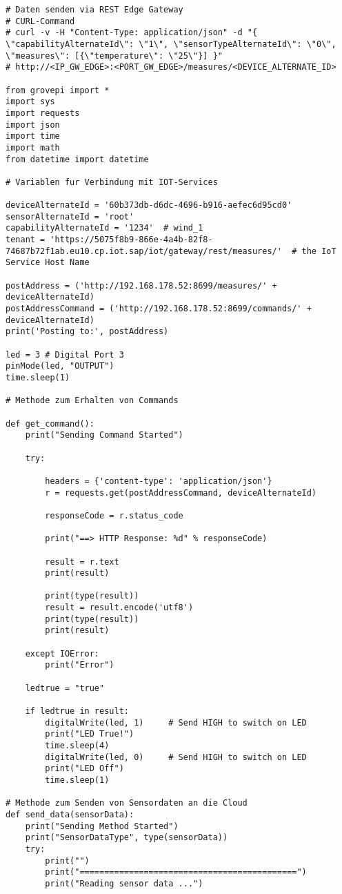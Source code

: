 \begin{lstlisting}
# Daten senden via REST Edge Gateway
# CURL-Command
# curl -v -H "Content-Type: application/json" -d "{ \"capabilityAlternateId\": \"1\", \"sensorTypeAlternateId\": \"0\", \"measures\": [{\"temperature\": \"25\"}] }"
# http://<IP_GW_EDGE>:<PORT_GW_EDGE>/measures/<DEVICE_ALTERNATE_ID>

from grovepi import *
import sys
import requests
import json
import time
import math
from datetime import datetime

# Variablen fur Verbindung mit IOT-Services

deviceAlternateId = '60b373db-d6dc-4696-b916-aefec6d95cd0'  
sensorAlternateId = 'root'  
capabilityAlternateId = '1234'  # wind_1
tenant = 'https://5075f8b9-866e-4a4b-82f8-74687b72f1ab.eu10.cp.iot.sap/iot/gateway/rest/measures/'  # the IoT Service Host Name

postAddress = ('http://192.168.178.52:8699/measures/' + deviceAlternateId)
postAddressCommand = ('http://192.168.178.52:8699/commands/' + deviceAlternateId)
print('Posting to:', postAddress)

led = 3 # Digital Port 3 
pinMode(led, "OUTPUT")
time.sleep(1)

# Methode zum Erhalten von Commands

def get_command():
    print("Sending Command Started")

    try:

        headers = {'content-type': 'application/json'}
        r = requests.get(postAddressCommand, deviceAlternateId)

        responseCode = r.status_code

        print("==> HTTP Response: %d" % responseCode)

        result = r.text
        print(result)

        print(type(result))
        result = result.encode('utf8')
        print(type(result))
        print(result)

    except IOError:
        print("Error")

    ledtrue = "true"

    if ledtrue in result:
        digitalWrite(led, 1)     # Send HIGH to switch on LED
        print("LED True!")
        time.sleep(4)
        digitalWrite(led, 0)     # Send HIGH to switch on LED
        print("LED Off")
        time.sleep(1)

# Methode zum Senden von Sensordaten an die Cloud
def send_data(sensorData):
    print("Sending Method Started")
    print("SensorDataType", type(sensorData))
    try:
        print("")
        print("============================================")
        print("Reading sensor data ...")


\end{lstlisting}
